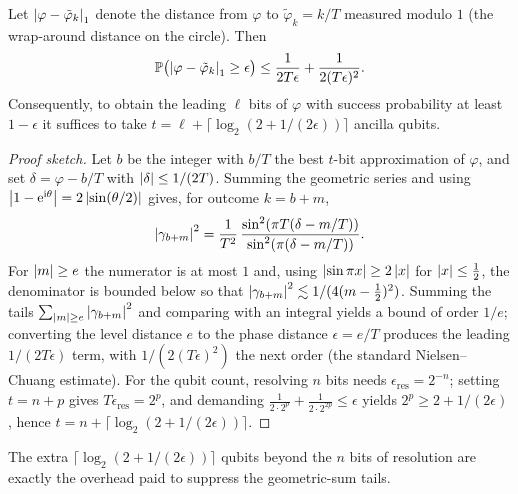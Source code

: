 \begin{theorem}
\label{thm:lec04-precision}
Let $\left\lvert \varphi-\tilde\varphi_k \right\rvert_1$ denote the distance from $\varphi$ to
$\tilde\varphi_k=k/T$ measured modulo $1$ (the wrap-around distance on the
circle). Then
\[
  \mathbb{P}\bigl(\left\lvert \varphi-\tilde\varphi_k \right\rvert_1\ge\epsilon\bigr)
  \le\frac{1}{2T\epsilon}+\frac{1}{2(T\epsilon)^{2}}.
\]
Consequently, to obtain the leading $\ell$ bits of $\varphi$ with success
probability at least $1-\epsilon$ it suffices to take
$t=\ell+\lceil\log_2(2+1/(2\epsilon))\rceil$ ancilla qubits.
\end{theorem}

\begin{proof}[Proof sketch]
Let $b$ be the integer with $b/T$ the best $t$-bit approximation of $\varphi$,
and set $\delta=\varphi-b/T$ with $\left\lvert \delta \right\rvert\le 1/(2T)$. Summing the geometric
series and using $\left\lvert 1-\mathrm{e}^{\mathrm{i}\theta} \right\rvert=2\left\lvert \sin(\theta/2) \right\rvert$ gives, for
outcome $k=b+m$,
\[
  \left\lvert \gamma_{b+m} \right\rvert^{2}
   =\frac{1}{T^{2}}\,
     \frac{\sin^{2}(\pi T(\delta-m/T))}{\sin^{2}(\pi(\delta-m/T))}.
\]
For $\left\lvert m \right\rvert\ge e$ the numerator is at most $1$ and, using $\left\lvert \sin\pi
x \right\rvert\ge2\left\lvert x \right\rvert$ for $\left\lvert x \right\rvert\le\tfrac12$, the denominator is bounded below so that
$\left\lvert \gamma_{b+m} \right\rvert^{2}\lesssim 1/(4(m-\tfrac12)^{2})$. Summing the tails
$\sum_{\left\lvert m \right\rvert\ge e}\left\lvert \gamma_{b+m} \right\rvert^{2}$ and comparing with an integral yields
a bound of order $1/e$; converting the level distance $e$ to the phase distance
$\epsilon=e/T$ produces the leading $1/(2T\epsilon)$ term, with
$1/(2(T\epsilon)^{2})$ the next order (the standard Nielsen--Chuang estimate).
For the qubit count, resolving $n$ bits needs $\epsilon_{\mathrm{res}}=2^{-n}$;
setting $t=n+p$ gives $T\epsilon_{\mathrm{res}}=2^{p}$, and demanding
$\tfrac{1}{2\cdot2^{p}}+\tfrac{1}{2\cdot2^{2p}}\le\epsilon$ yields
$2^{p}\ge2+1/(2\epsilon)$, hence $t=n+\lceil\log_2(2+1/(2\epsilon))\rceil$.
\end{proof}

The extra $\lceil\log_2(2+1/(2\epsilon))\rceil$ qubits beyond the $n$ bits of
resolution are exactly the overhead paid to suppress the geometric-sum tails.

